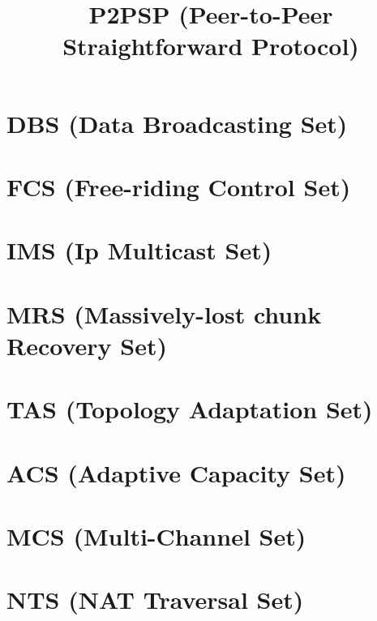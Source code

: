\newcommand{\note}[1]{\color{red}\textbf{#1}}

\title{P2PSP (Peer-to-Peer Straightforward Protocol)}
\maketitle
\tableofcontents

\begin{abstract}

\end{abstract}

\section{DBS (Data Broadcasting Set)}
\label{sec:DBS}


\section{FCS (Free-riding Control Set)}
\label{sec:FCS}


\section{IMS (Ip Multicast Set)}
\label{sec:IMS}


\section{MRS (Massively-lost chunk Recovery Set)}
\label{sec:MRS}


\section{TAS (Topology Adaptation Set)}
\label{sec:TAS}


\section{ACS (Adaptive Capacity Set)}
\label{sec:ACS}


\section{MCS (Multi-Channel Set)}
\label{sec:MCS}


\section{NTS (NAT Traversal Set)}
\label{sec:NTS}



